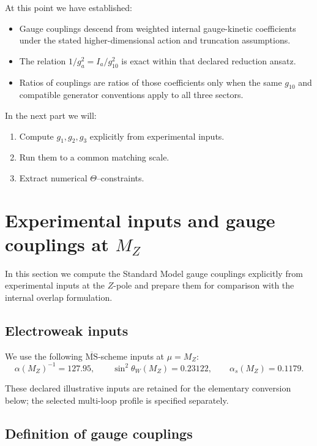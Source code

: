 \documentclass[11pt]{article}
\begin{document}
At this point we have established:

\begin{itemize}
\item Gauge couplings descend from weighted internal gauge-kinetic coefficients
under the stated higher-dimensional action and truncation assumptions.
\item The relation $1/g_a^2=I_a/g_{10}^2$ is exact within that declared
reduction ansatz.
\item Ratios of couplings are ratios of those coefficients only when the same
$g_{10}$ and compatible generator conventions apply to all three sectors.
\end{itemize}

In the next part we will:
\begin{enumerate}
\item Compute $g_1,g_2,g_3$ explicitly from experimental inputs.
\item Run them to a common matching scale.
\item Extract numerical $\Theta$--constraints.
\end{enumerate}
\section{Experimental inputs and gauge couplings at
\texorpdfstring{$M_Z$}{MZ}}

In this section we compute the Standard Model gauge couplings explicitly
from experimental inputs at the $Z$-pole and prepare them for comparison
with the internal overlap formulation.

\subsection{Electroweak inputs}

We use the following $\overline{\mathrm{MS}}$-scheme inputs at $\mu=M_Z$:
\begin{equation}
\alpha(M_Z)^{-1} = 127.95,
\qquad
\sin^2\theta_W(M_Z) = 0.23122,
\qquad
\alpha_s(M_Z) = 0.1179.
\label{eq:EWinputs}
\end{equation}

These declared illustrative inputs are retained for the elementary conversion
below; the selected multi-loop profile is specified separately.

\subsection{Definition of gauge couplings}
\end{document}
